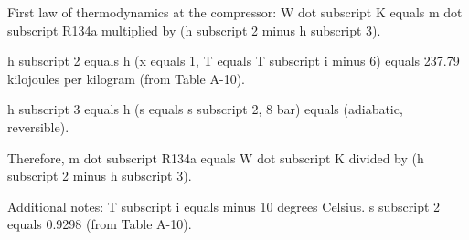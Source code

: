 First law of thermodynamics at the compressor:  
W dot subscript K equals m dot subscript R134a multiplied by (h subscript 2 minus h subscript 3).  

h subscript 2 equals h (x equals 1, T equals T subscript i minus 6) equals 237.79 kilojoules per kilogram (from Table A-10).  

h subscript 3 equals h (s equals s subscript 2, 8 bar) equals (adiabatic, reversible).  

Therefore, m dot subscript R134a equals W dot subscript K divided by (h subscript 2 minus h subscript 3).  

Additional notes:  
T subscript i equals minus 10 degrees Celsius.  
s subscript 2 equals 0.9298 (from Table A-10).